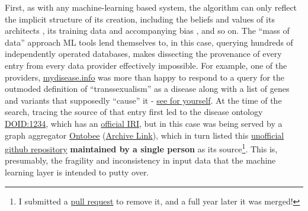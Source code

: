 First, as with any machine-learning based system, the algorithm can only
reflect the implicit structure of its creation, including the beliefs
and values of its architects \cite{birhaneValuesEncodedMachine2022, birhaneAlgorithmicInjusticeRelational2021} , its training data and
accompanying bias \cite{birhaneMultimodalDatasetsMisogyny2021} ,
and so on. The ``mass of data'' approach ML tools lend themselves to, in
this case, querying hundreds of independently operated databases, makes
dissecting the provenance of every entry from every data provider
effectively impossible. For example, one of the providers,
\href{https://mydisease.info}{mydisease.info} was more than happy to
respond to a query for the outmoded definition of ``transsexualism'' as
a disease \cite{ramTransphobiaEncodedExamination2021}  along with
a list of genes and variants that supposedly ``cause'' it -
\href{http://mydisease.info/v1/query?q=\%22DOID\%3A10919\%22}{see for
yourself}. At the time of the search, tracing the source of that entry
first led to the disease ontology
\href{https://web.archive.org/web/20211007053446/https://www.ebi.ac.uk/ols/ontologies/doid/terms?iri=http\%3A\%2F\%2Fpurl.obolibrary.org\%2Fobo\%2FDOID_1234}{DOID:1234},
which has an \href{http://purl.obolibrary.org/obo/doid.owl}{official
IRI}, but in this case was being served by a graph aggregator
\href{http://www.ontobee.org/ontology/DOID?iri=http://purl.obolibrary.org/obo/DOID_1234}{Ontobee}
(\href{https://web.archive.org/web/20210923110103/http://www.ontobee.org/ontology/DOID?iri=http://purl.obolibrary.org/obo/DOID_1234}{Archive
Link}), which in turn listed this
\href{https://github.com/jannahastings/mental-functioning-ontology}{unofficial
github repository} \textbf{maintained by a single person} as its
source\footnote{I submitted a
  \href{https://github.com/jannahastings/mental-functioning-ontology/pull/8}{pull
  request} to remove it, and a full year later it was merged!}. This is,
presumably, the fragility and inconsistency in input data that the
machine learning layer is intended to putty over.

